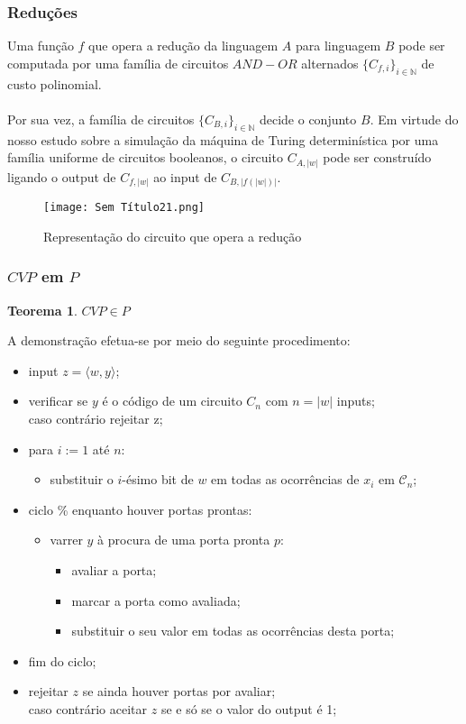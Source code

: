 \documentclass[10pt,a4paper]{report}
\newtheorem{theorem}{Teorema}
\begin{document}
\subsubsection{Reduções}
Uma função $f$ que opera a redução da linguagem $A$ para linguagem $B$ pode ser computada por uma família de circuitos $AND-OR$ alternados $\{C_{f,i}\}_{i\in \mathbb{N}}$ de custo polinomial.\\
\\
Por sua vez, a família de circuitos $\{C_{B,i}\}_{i\in\mathbb{N}}$ decide o conjunto $B$. Em virtude do nosso estudo sobre a simulação da máquina de Turing determinística por uma família uniforme de circuitos booleanos, o circuito $C_{A,|w|}$ pode ser construído ligando o output de $C_{f,|w|}$ ao input de $C_{B,|f (|w|)|}$.
\begin{figure}[H]
\centering
\texttt{[image: Sem Título21.png]}
\caption{Representação do circuito que opera a redução}
\end{figure}
\subsubsection{$CVP$ em $P$}
\begin{theorem}
$CVP \in P$
\end{theorem}
A demonstração efetua-se por meio do seguinte procedimento:
\begin{itemize}
\item input $z = \langle w, y\rangle$;
\item verificar se $y$ é o código de um circuito $C_n$ com $n = |w|$ inputs; \\caso contrário rejeitar z;
\item para $i := 1$ até $n$:
\begin{itemize}
\item substituir o $i$-ésimo bit de $w$ em todas as ocorrências de $x_i$ em $\mathcal{C}_n$;
\end{itemize}
\item ciclo \% enquanto houver portas prontas:
\begin{itemize}
\item varrer $y$ à procura de uma porta pronta $p$:
\begin{itemize}
\item avaliar a porta;
\item marcar a porta como avaliada;
\item substituir o seu valor em todas as ocorrências desta porta;
\end{itemize}
\end{itemize}
\item fim do ciclo;
\item rejeitar $z$ se ainda houver portas por avaliar; \\caso contrário aceitar $z$ se e só se o valor do output é 1;
\end{itemize}
\end{document}
